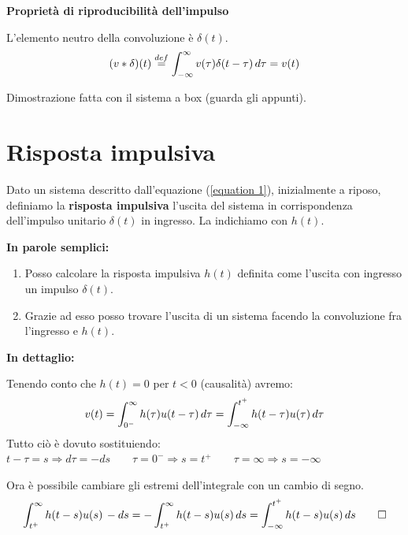 	\begin{osservazione}
		\textbf{Proprietà di riproducibilità dell'impulso}
		
		L'elemento neutro della convoluzione è $ \delta(t)$.
		\[ (v *\delta)(t)\overset{def}{=} \int_{-\infty}^{\infty}v(\tau)\delta(t - \tau)\, d\tau = v(t) \]
	\end{osservazione}
	
	Dimostrazione fatta con il sistema a box (guarda gli appunti). %
		

\section{Risposta impulsiva}
	
	\begin{definizione}
		Dato un sistema descritto dall'equazione (\ref{equation 1}), inizialmente a riposo, definiamo la \textbf{risposta impulsiva} l'uscita del sistema in corrispondenza dell'impulso unitario $\delta (t)$ in ingresso. La indichiamo con $h(t)$.
	\end{definizione}
	
	\textbf{In parole semplici: }
	\begin{enumerate}
	\item Posso calcolare la risposta impulsiva $ h(t) $  definita come l'uscita con ingresso un impulso $\delta(t)$.
	\item Grazie ad esso posso trovare l'uscita di un sistema facendo la convoluzione fra l'ingresso e $ h(t) $.
	\end{enumerate}

	\textbf{In dettaglio: } 
		
	Tenendo conto che $h(t)=0$ per $t<0$ (causalità) avremo:
	\begin{equation*}
	v(t)= \int_{0^-}^{\infty}h(\tau)u(t - \tau)\, d\tau 
	= \int_{-\infty}^{t^+}h(t - \tau)u(\tau)\, d\tau
	\end{equation*}
	Tutto ciò è dovuto sostituiendo:  $t-\tau = s \Rightarrow d\tau = - ds 
	\qquad \tau = 0^-  \Rightarrow s = t^+ 
	\qquad \tau=\infty \Rightarrow s = -\infty$
	
	Ora è possibile cambiare gli estremi dell'integrale con un cambio di segno.
	\[
	\int_{t^+}^{\infty}h(t-s)u(s)\,-ds 
	=-\int_{t^+}^{\infty}h(t-s)u(s)\, d s
	=\int_{-\infty}^{t^+}h(t-s)u(s)\, d s
	\qedhere
	\]
	
